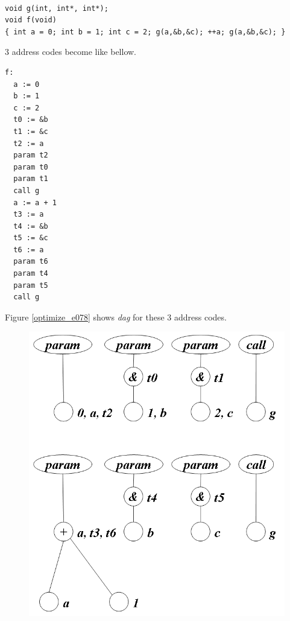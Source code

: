 \begin{Example}
\label{optimize_e077}
\begin{verbatim}

void g(int, int*, int*);
void f(void)
{ int a = 0; int b = 1; int c = 2; g(a,&b,&c); ++a; g(a,&b,&c); }
\end{verbatim}
3 address codes become like bellow.
\begin{verbatim}
f:
  a := 0
  b := 1
  c := 2
  t0 := &b
  t1 := &c
  t2 := a
  param t2
  param t0
  param t1
  call g
  a := a + 1
  t3 := a
  t4 := &b
  t5 := &c
  t6 := a
  param t6
  param t4
  param t5
  call g
\end{verbatim}
Figure \ref{optimize_e078} shows {\em dag} for these 3 address codes.
\begin{figure}[htbp]
\begin{center}
\begin{htmlonly}
\includegraphics[width=1.0\linewidth,height=0.894\linewidth]{opt032.png}
\end{htmlonly}
\begin{latexonly}

\end{latexonly}
\end{center}
\end{figure}
\end{Example}
